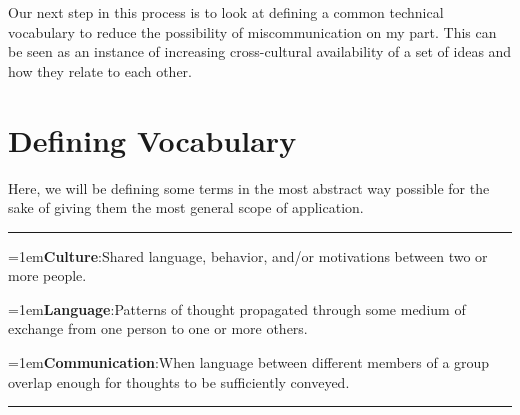 \documentclass[10pt]{article}
\def\mydef#1#2{\noindent\hangindent=1em{\bf #1}\hspace{0.5em}:\hspace{0.5em}#2

}
\begin{document}
Our next step in this process is to look at defining a common technical vocabulary to reduce the possibility of miscommunication on my part.
This can be seen as an instance of increasing cross-cultural availability of a set of ideas and how they relate to each other.

\section{Defining Vocabulary}
Here, we will be defining some terms in the most abstract way possible for the sake of giving them the most general scope of application.

\vspace{1.5em}\hrule\vspace{1em}
    \mydef{Culture}{Shared language, behavior, and/or motivations between two or more people.}
    \vspace{0.5em}
    \mydef{Language}{Patterns of thought propagated through some medium of exchange from one person to one or more others.}
    \vspace{0.5em}
    \mydef{Communication}{When language between different members of a group overlap enough for thoughts to be sufficiently conveyed.}
\vspace{1em}\hrule\vspace{1em}

\end{document}
